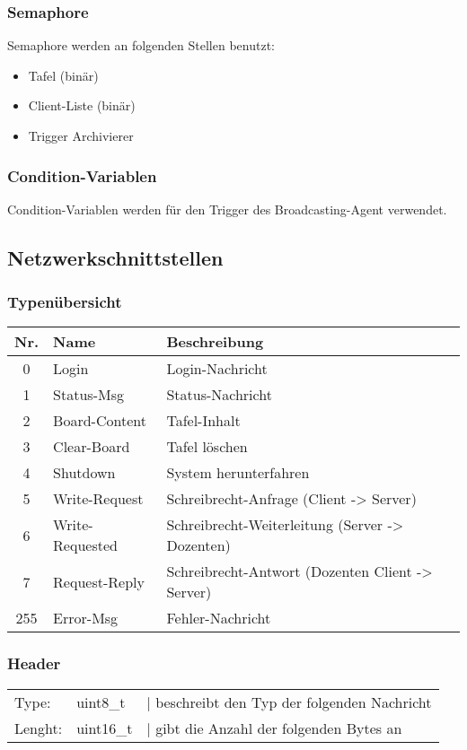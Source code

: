 \subsubsection{Semaphore}
Semaphore werden an folgenden Stellen benutzt:
\begin{itemize}
 \item Tafel (binär)
 \item Client-Liste (binär)
 \item Trigger Archivierer
\end{itemize}

\subsubsection{Condition-Variablen}
Condition-Variablen werden für den Trigger des Broadcasting-Agent verwendet.

\subsection{Netzwerkschnittstellen}

\subsubsection{Typenübersicht}
\begin{tabular}{c|l|l}
Nr. & Name & Beschreibung \\ \hline
0 & Login & Login-Nachricht \\
1 & Status-Msg & Status-Nachricht \\
2 & Board-Content & Tafel-Inhalt \\
3 & Clear-Board & Tafel löschen \\
4 & Shutdown & System herunterfahren \\
5 & Write-Request & Schreibrecht-Anfrage (Client -> Server) \\
6 & Write-Requested & Schreibrecht-Weiterleitung (Server -> Dozenten) \\
7 & Request-Reply & Schreibrecht-Antwort (Dozenten Client -> Server) \\
255 & Error-Msg & Fehler-Nachricht
\end{tabular}

\subsubsection{Header}
\begin{tabular}{lll}
Type: & uint8\_t & | beschreibt den Typ der folgenden Nachricht \\
Lenght: & uint16\_t & | gibt die Anzahl der folgenden Bytes an
\end{tabular}

